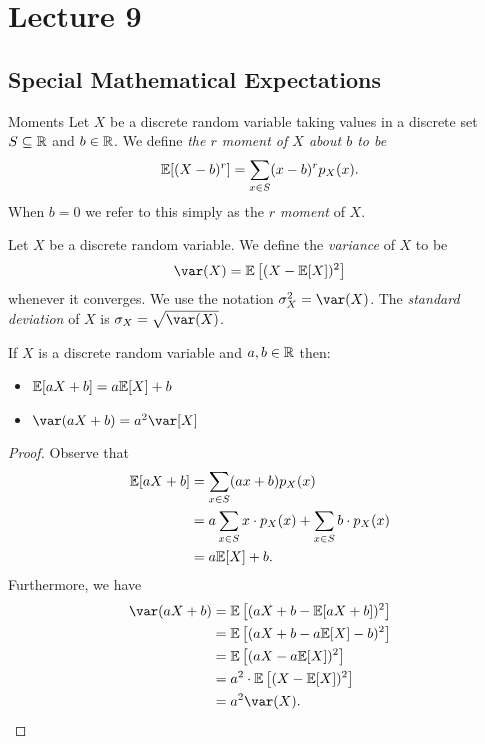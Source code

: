 \documentclass[class=article, crop=false]{standalone}
\begin{document}
  \section{Lecture 9}
  \subsection{Special Mathematical Expectations}
  \begin{definition}{Moments}
    Let $X$ be a discrete random variable taking values in a discrete set $S\subseteq \mathbb{R}$ and $b\in \mathbb{R}$. We define \emph{the $r$ moment of $X$ about $b$ to be}
    \[
      \mathbb{E}[(X - b)^r] = \sum_{x\in S}(x - b)^rp_X(x).
    \]
    When $b = 0$ we refer to this simply as the \emph{$r$ moment} of $X$.
  \end{definition}
  \begin{definition}{}
    Let $X$ be a discrete random variable. We define the \emph{variance} of $X$ to be
    \[
      \var(X) = \E\left[(X - \E[X])^2\right]
    \]
    whenever it converges. We use the notation $\sigma_X^2 = \var(X)$. The \emph{standard deviation} of $X$ is $\sigma_X = \sqrt{\var(X)}$.
  \end{definition}
  \begin{theorem}{}
    If $X$ is a discrete random variable and $a, b\in\mathbb{R}$ then:
    \begin{itemize}
      \item $\mathbb{E}[aX + b] = a\mathbb{E}[X] + b$
      \item $\var(aX + b) = a^2\var[X]$
    \end{itemize}
    \begin{proof}
      Observe that
      \begin{align*}
        \mathbb{E}[aX + b] &= \sum_{x\in S}(ax + b)p_X(x) \\
                   &= a\sum_{x\in S}x\cdot p_X(x) + \sum_{x\in S} b\cdot p_X(x) \\
                   &= a\mathbb{E}[X] + b.
      \end{align*}
      Furthermore, we have
      \begin{align*}
        \var(aX + b) &= \E\left[(aX + b - \E[aX + b])^2\right] \\
                     &= \E\left[(aX + b - a\E[X] - b)^2\right] \\
                     &= \E\left[(aX - a\E[X])^2\right] \\
                     &= a^2\cdot \E\left[(X - \E[X])^2\right] \\
                     &= a^2\var(X).
      \end{align*}
    \end{proof}
  \end{theorem}
\end{document}

